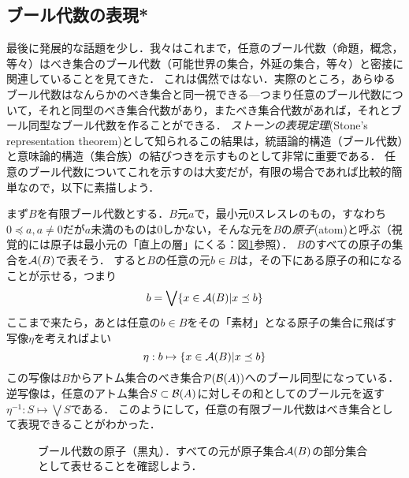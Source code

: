 \documentclass[11pt,a4paper]{jsarticle}
\begin{document}



\subsection{ブール代数の表現*}

最後に発展的な話題を少し．我々はこれまで，任意のブール代数（命題，概念，等々）はべき集合のブール代数（可能世界の集合，外延の集合，等々）と密接に関連していることを見てきた．
これは偶然ではない．実際のところ，あらゆるブール代数はなんらかのべき集合と同一視できる---つまり任意のブール代数について，それと同型のべき集合代数があり，またべき集合代数があれば，それとブール同型なブール代数を作ることができる．
\emph{ストーンの表現定理}(Stone's representation theorem)として知られるこの結果は，統語論的構造（ブール代数）と意味論的構造（集合族）の結びつきを示すものとして非常に重要である．
任意のブール代数についてこれを示すのは大変だが，有限の場合であれば比較的簡単なので，以下に素描しよう．

まず$B$を有限ブール代数とする．$B$元$a$で，最小元$0$スレスレのもの，すなわち$0 \preceq a, a \neq 0$だが$a$未満のものは$0$しかない，そんな元を$B$の\emph{原子}(atom)と呼ぶ（視覚的には原子は最小元の「直上の層」にくる：図\ref{fig:atoms}参照）．
$B$のすべての原子の集合を$\mathcal{A}(B)$で表そう．
すると$B$の任意の元$b \in B$は，その下にある原子の和になることが示せる，つまり
\[ b = \bigvee \{ x \in \mathcal{A}(B) | x \preceq b \} \]
ここまで来たら，あとは任意の$b \in B$をその「素材」となる原子の集合に飛ばす写像$\eta$を考えればよい
\[ \eta: b \mapsto \{ x \in \mathcal{A}(B) | x \preceq b \} \]
この写像は$B$からアトム集合のべき集合$\mathcal{P}(\mathcal{B}(A))$へのブール同型になっている．
逆写像は，任意のアトム集合$S \subset \mathcal{B}(A)$に対しその和としてのブール元を返す$\eta^{-1}: S \mapsto \bigvee S$である．
このようにして，任意の有限ブール代数はべき集合として表現できることがわかった．

\begin{figure}[h]
    \centering
    \caption{ブール代数の原子（黒丸）．すべての元が原子集合$\mathcal{A}(B)$の部分集合として表せることを確認しよう．}
    \label{fig:atoms} 
\end{figure}
    
\end{document}
